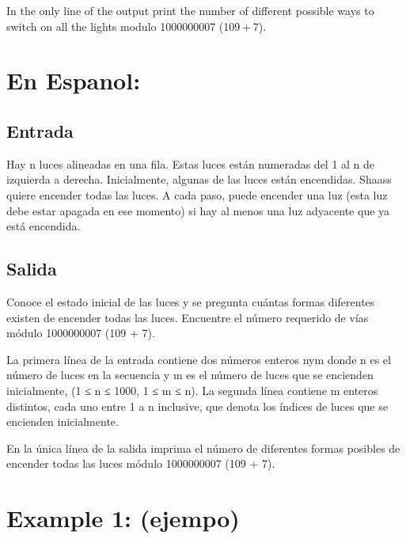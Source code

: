 \documentclass[12pt]{article}
\begin{document}
    \begin{flushleft}
        In the only line of the output print the number of different possible ways to switch on all the lights modulo 1000000007 (109 + 7).
    \end{flushleft}
    
    \section*{En Espanol:}
    
    \subsection*{Entrada}
    \begin{flushleft}
        Hay n luces alineadas en una fila. Estas luces están numeradas del 1 al n de izquierda a derecha. Inicialmente, algunas de las luces están encendidas. Shaass quiere encender todas las luces. A cada paso, puede encender una luz (esta luz debe estar apagada en ese momento) si hay al menos una luz adyacente que ya está encendida.
    \end{flushleft}

    \subsection*{Salida}
    \begin{flushleft}
        Conoce el estado inicial de las luces y se pregunta cuántas formas diferentes existen de encender todas las luces. Encuentre el número requerido de vías módulo 1000000007 (109 + 7).
    \end{flushleft}
    \begin{flushleft}
        La primera línea de la entrada contiene dos números enteros nym donde n es el número de luces en la secuencia y m es el número de luces que se encienden inicialmente, (1 ≤ n ≤ 1000, 1 ≤ m ≤ n). La segunda línea contiene m enteros distintos, cada uno entre 1 a n inclusive, que denota los índices de luces que se encienden inicialmente.
    \end{flushleft}
    \begin{flushleft}
        En la única línea de la salida imprima el número de diferentes formas posibles de encender todas las luces módulo 1000000007 (109 + 7).
    \end{flushleft}
    
    \section*{Example 1: (ejempo)}
    
\end{document}
